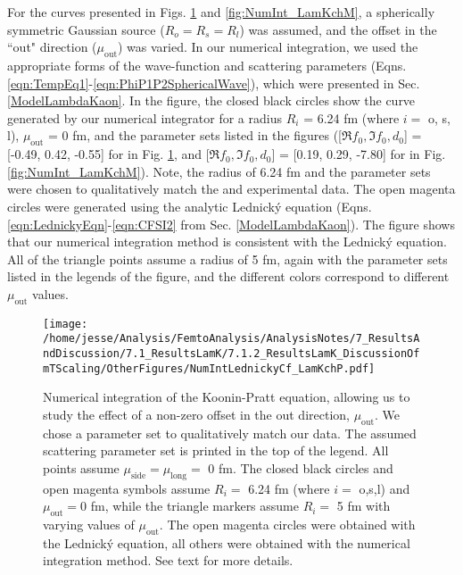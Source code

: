 \documentclass[/home/jesse/Analysis/FemtoAnalysis/AnalysisNotes/AnalysisNoteJBuxton.tex]{subfiles}
\begin{document}
For the curves presented in Figs. \ref{fig:NumInt_LamKchP} and \ref{fig:NumInt_LamKchM}, a spherically symmetric Gaussian source ($R_{o}=R_{s}=R_{l}$) was assumed, and the offset in the ``out" direction ($\mu_{\mathrm{out}}$) was varied.
In our numerical integration, we used the appropriate forms of the wave-function and scattering parameters (Eqns. \ref{eqn:TempEq1}-\ref{eqn:PhiP1P2SphericalWave}), which were presented in Sec. \ref{ModelLambdaKaon}.
In the figure, the closed black circles show the curve generated by our numerical integrator for a radius $R_{i}$ = 6.24 fm (where $i =$ o, s, l), $\mu_{\mathrm{out}}$ = 0 fm, and the parameter sets listed in the figures ([$\Re f_{0}, \Im f_{0}, d_{0}$] = [-0.49, 0.42, -0.55] for \LamKchP in Fig. \ref{fig:NumInt_LamKchP}, and [$\Re f_{0}, \Im f_{0}, d_{0}$] = [0.19, 0.29, -7.80] for \LamKchM in Fig. \ref{fig:NumInt_LamKchM}).
Note, the radius of 6.24 fm and the parameter sets were chosen to qualitatively match the \LamKchP and \LamKchM experimental data.
The open magenta circles were generated using the analytic Lednick\'y equation (Eqns. \ref{eqn:LednickyEqn}-\ref{eqn:CFSI2} from Sec. \ref{ModelLambdaKaon}).
The figure shows that our numerical integration method is consistent with the Lednick\'y equation.
All of the triangle points assume a radius of 5 fm, again with the parameter sets listed in the legends of the figure, and the different colors correspond to different $\mu_{\mathrm{out}}$ values.

\begin{figure}[h!]
  \centering
  \texttt{[image: /home/jesse/Analysis/FemtoAnalysis/AnalysisNotes/7\_ResultsAndDiscussion/7.1\_ResultsLamK/7.1.2\_ResultsLamK\_DiscussionOfmTScaling/OtherFigures/NumIntLednickyCf\_LamKchP.pdf]}
  \caption[Numerical integration of Koonin-Pratt equation: \LamKchP]
  {
  Numerical integration of the Koonin-Pratt equation, allowing us to study the effect of a non-zero offset in the out direction, $\mu_{\mathrm{out}}$.
  We chose a parameter set to qualitatively match our \LamKchP data.
  The assumed scattering parameter set is printed in the top of the legend.
  All points assume $\mu_{\mathrm{side}} = \mu_{\mathrm{long}} =$ 0 fm.
  The closed black circles and open magenta symbols assume $R_{i} =$ 6.24 fm (where $i =$ o,s,l) and $\mu_{\mathrm{out}} = 0$ fm, while the triangle markers assume $R_{i} =$ 5 fm with varying values of $\mu_{\mathrm{out}}$.
  The open magenta circles were obtained with the Lednick\'y equation, all others were obtained with the numerical integration method.
  See text for more details.
  }
  \label{fig:NumInt_LamKchP}
\end{figure}
\end{document}
